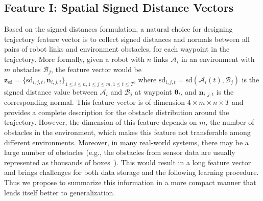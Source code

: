 \documentclass[letterpaper, 10 pt, conference]{ieeeconf}  %
\newcommand{\btheta}{\mbox{$\bm \theta$}}
\newcommand{\fsd}{\mbox{$\mathbf z_{\text{sd}}$}}
\begin{document}
\subsection{Feature I: Spatial Signed Distance Vectors}
Based on the signed distances formulation, a natural choice for designing trajectory feature vector is to collect signed distances and normals between all pairs of robot links and environment obstacles, for each waypoint in the trajectory. More formally, given a robot with $n$ links $\mathcal A_i$ in an environment with $m$ obstacles $\mathcal B_j$, the feature vector would be $\fsd = \{\text{sd}_{i,j,t}, \mathbf n_{i,j,t}\}_{1\leq i \leq n, 1\leq j \leq m, 1\leq t \leq T}$, where $\text{sd}_{i,j,t} = \text{sd}(\mathcal A_i(t), \mathcal B_j)$ is the signed distance value between $\mathcal A_i$ and $\mathcal B_j$ at waypoint $\btheta_t$, and $\mathbf n_{i,j,t}$ is the corresponding normal. This feature vector is of dimension $4\times m \times n \times T$ and provides a complete description for the obstacle distribution around the trajectory. However, the dimension of this feature depends on $m$, the number of obstacles in the environment, which makes this feature not transferable among different environments. Moreover, in many real-world systems, there may be a large number of obstacles (e.g., the obstacles from sensor data are usually represented as thousands of boxes~\cite{Sucan:2010:CPT}). This would result in a long feature vector and brings challenges for both data storage and the following learning procedure. Thus we propose to summarize this information in a more compact manner that lends itself better to generalization.
\end{document}
